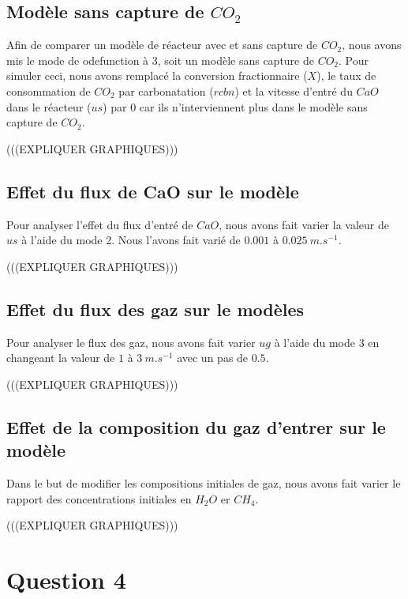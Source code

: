 \documentclass[11pt]{report}
\newcommand{\mychapter}[2]{
    \setcounter{chapter}{#1}
    \setcounter{section}{0}
    \chapter*{#2}
    \addcontentsline{toc}{chapter}{#2}
}
\begin{document}
        \section{Modèle sans capture de $CO_2$}
            Afin de comparer un modèle de réacteur avec et sans capture de $CO_2$,
            nous avons mis le mode de odefunction à 3, soit un modèle sans capture de $CO_2$.
            Pour simuler ceci, nous avons remplacé la conversion fractionnaire ($X$),
            le taux de consommation de $CO_2$ par carbonatation ($rcbn$)
            et la vitesse d'entré du $CaO$ dans le réacteur ($us$)
            par $0$ car ils n'interviennent plus dans le modèle sans capture de $CO_2$.
            \par
            (((EXPLIQUER GRAPHIQUES)))

        \section{Effet du flux de CaO sur le modèle}
            Pour analyser l'effet du flux d'entré de $CaO$,
            nous avons fait varier la valeur de $us$ à l'aide du mode 2.
            Nous l'avons fait varié de $0.001$ à $0.025\ m.s^{-1}$.
            \par
            (((EXPLIQUER GRAPHIQUES)))
        
        \section{Effet du flux des gaz sur le modèles}
            Pour analyser le flux des gaz, nous avons fait varier $ug$ à l'aide du mode 3
            en changeant la valeur de $1$ à $3\ m.s^{-1}$ avec un pas de $0.5$.
            \par
            (((EXPLIQUER GRAPHIQUES)))
        
        \section{Effet de la composition du gaz d'entrer sur le modèle}
            Dans le but de modifier les compositions initiales de gaz,
            nous avons fait varier le rapport des concentrations initiales en $H_2O$ er $CH_4$.
            \par
            (((EXPLIQUER GRAPHIQUES)))

    \mychapter{4}{Question 4}
\end{document}
